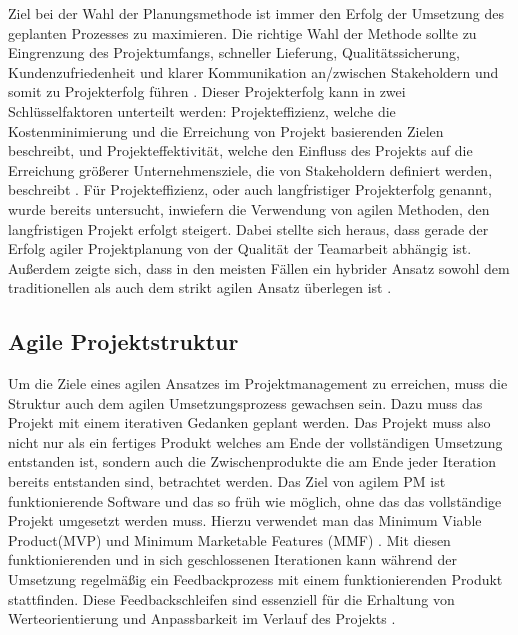 Ziel bei der Wahl der Planungsmethode ist immer den Erfolg der Umsetzung des geplanten Prozesses zu maximieren.
Die richtige Wahl der Methode sollte zu Eingrenzung des Projektumfangs, schneller Lieferung, Qualitätssicherung, Kundenzufriedenheit und klarer Kommunikation an/zwischen Stakeholdern und somit zu Projekterfolg führen \cite{systemsApproachToPlanningSchedulingAndControlling}.
Dieser Projekterfolg kann in zwei Schlüsselfaktoren unterteilt werden: Projekteffizienz, welche die Kostenminimierung und die Erreichung von Projekt basierenden Zielen beschreibt, und Projekteffektivität, welche den Einfluss des Projekts auf die Erreichung größerer Unternehmensziele, die von Stakeholdern definiert werden, beschreibt \cite{relationshipBetweenProjectSuccessAndProjectEfficiency}.
Für Projekteffizienz, oder auch langfristiger Projekterfolg genannt, wurde bereits untersucht, inwiefern die Verwendung von agilen Methoden, den langfristigen Projekt erfolgt steigert. Dabei stellte sich heraus, dass gerade der Erfolg agiler Projektplanung von der Qualität der Teamarbeit abhängig ist.
Außerdem zeigte sich, dass in den meisten Fällen ein hybrider Ansatz sowohl dem traditionellen als auch dem strikt agilen Ansatz überlegen ist \cite{traditionalAndAgileOnProjectSuccess}.

\subsection{Agile Projektstruktur}
Um die Ziele eines agilen Ansatzes im Projektmanagement zu erreichen, muss die Struktur auch dem agilen Umsetzungsprozess gewachsen sein. Dazu muss das Projekt mit einem iterativen Gedanken geplant werden. Das Projekt muss also nicht nur als ein fertiges Produkt welches am Ende der vollständigen Umsetzung entstanden ist, sondern auch die Zwischenprodukte die am Ende jeder Iteration bereits entstanden sind, betrachtet werden. Das Ziel von agilem PM ist funktionierende Software und das so früh wie möglich, ohne das das vollständige Projekt umgesetzt werden muss. Hierzu verwendet man das Minimum Viable Product(MVP) und Minimum Marketable Features (MMF) \cite{agilesProjektmanagementImBerufsalltagMVPundMMF}.  Mit diesen funktionierenden und in sich geschlossenen Iterationen kann während der Umsetzung regelmäßig ein Feedbackprozess mit einem funktionierenden Produkt stattfinden. Diese Feedbackschleifen sind essenziell für die Erhaltung von Werteorientierung und Anpassbarkeit im Verlauf des Projekts \cite{AMORIM2021101496}.

